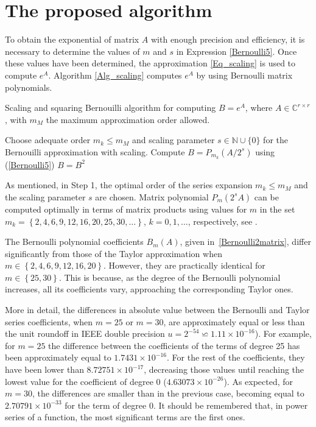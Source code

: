 \documentclass[preprint,10pt,numbers,sort&compress]{elsarticle}
\begin{document}
\section{The proposed algorithm}\label{sec:algorithm}
To obtain the exponential of matrix $A$ with enough precision and efficiency, it is necessary to determine the values of $m$ and $s$ in  Expression \eqref{Bernoulli5}. Once these values have been determined, the approximation \eqref{Eq_scaling} is used to compute $e^A$. Algorithm \ref{Alg_scaling} computes $e^A$ by using Bernoulli matrix polynomials.

\begin{algorithm}[H]
\caption{Scaling and squaring Bernouilli algorithm for computing $B=e^{A}$,
where $A \in {\mathbb{C}^{r \times r}}$, with $m_{M}$ the maximum approximation order allowed.}
\label{Alg_scaling}
\begin{algorithmic} [1]
\State Choose adequate order $m_k \leqslant {m_{M}}$ and scaling parameter
$s\in \mathbb{N}\cup\{0\}$ for the Bernouilli approximation with scaling.
\State Compute $B = {P_{m_k}}(A/2^{s})$ using (\ref{Bernoulli5})
    \State $B=B^{2}$
 \EndFor
\end{algorithmic}
\end{algorithm}

As mentioned, in Step 1, the optimal order of the series expansion $m_{k}
\leqslant {m_{M}}$ and the scaling parameter $s$ are chosen. Matrix
polynomial $P_{m}(2^{s}A)$ can be computed optimally in terms of
matrix products using values for $m$ in the set
$m_k=\left\{2,4,6,9,12,16, 20,25,30,\ldots\right\}$,
$k=0,1,\ldots$, respectively, see \cite[p. 72--74]{High08}.

The Bernoulli polynomial coefficients $B_m(A)$, given in~\eqref{Bernoulli2matrix}, differ significantly from those of the Taylor approximation when $m \in \left\{ {2, 4, 6, 9, 12, 16, 20} \right\}$. However, they are practically identical for $m \in \left\{ {25,30} \right\}$. This is because, as the degree of the Bernoulli polynomial increases, all its coefficients vary, approaching the corresponding Taylor ones.

More in detail, the differences in absolute value between the Bernoulli and Taylor series coefficients, when $m = 25$ or $m=30$, are approximately equal or less than the unit roundoff in IEEE double precision $u=2^{-54}\backsimeq 1.11\times 10^{-16}$). For
example, for $m=25$ the difference between the coefficients of the terms of degree 25 has been approximately equal to $1.7431\times10^{-16}$. For the rest of the coefficients, they have been lower than $8.72751\times10^{-17}$, decreasing those values until reaching the lowest value for the coefficient of degree 0 ($4.63073\times10^{-26}$). As expected, for $m = 30$, the differences are smaller than in the previous case, becoming equal to $2.70791\times10^{-33}$ for the term of degree 0. It should be remembered that, in power series of a function, the most significant terms are the first ones.
\end{document}
